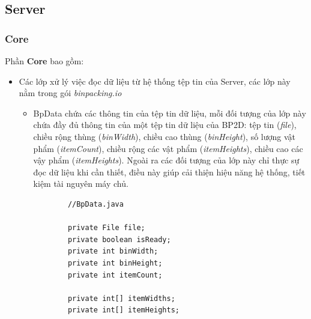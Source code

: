 \subsection{Server}
\subsubsection{Core}
Phần \textbf{Core} bao gồm:
\begin{itemize}
	\item Các lớp xử lý việc đọc dữ liệu từ hệ thống tệp tin của Server, các lớp này nằm trong gói \textit{binpacking.io}
	\begin{itemize}
		\item \textsf{BpData} chứa các thông tin của tệp tin dữ liệu, mỗi đối tượng của lớp này chứa đầy đủ thông tin của một tệp tin dữ liệu của BP2D: tệp tin (\textit{file}), chiều rộng thùng (\textit{binWidth}), chiều cao thùng (\textit{binHeight}), số lượng vật phẩm (\textit{itemCount}), chiều rộng các vật phẩm (\textit{itemHeights}), chiều cao các vậy phẩm (\textit{itemHeights}). Ngoài ra các đối tượng của lớp này chỉ thực sự đọc dữ liệu khi cần thiết, điều này giúp cải thiện hiệu năng hệ thống, tiết kiệm tài nguyên máy chủ.
		\begin{lstlisting}
		//BpData.java
		
		private File file;
		private boolean isReady;
		private int binWidth;
		private int binHeight;
		private int itemCount;
	
		private int[] itemWidths;
		private int[] itemHeights;
		

\end{lstlisting}
\end{itemize}
\end{itemize}
